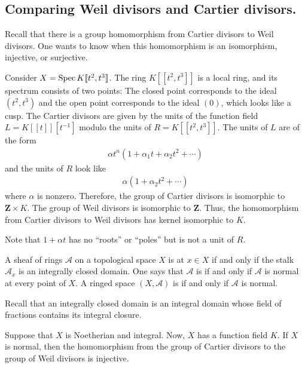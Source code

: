 \documentclass [11 pt, oneside] {article}
\begin{document}
\subsection{Comparing Weil divisors and Cartier divisors.}
Recall that there is a group homomorphism from Cartier divisors to Weil divisors. One wants to know when this homomorphism is an isomorphism, injective, or surjective.

\begin{example}\label{noninjdiv_1}\text{}
Consider $X = \operatorname{Spec} K [\![t^2,t^3]\!]$. The ring $K[\![t^2,t^3]\!]$ is a local ring, and its spectrum consists of two points: The closed point corresponds to the ideal $(t^2,t^3)$ and the open point corresponds to the ideal $(0)$, which looks like a cusp. The Cartier divisors are given by the units of the function field $L= K[\![t]\!][t^{-1}]$ modulo the units of $R = K [\![t^2,t^3]\!]$. The units of $L$ are of the form
\begin{align*}
	\alpha t^n(1+\alpha_1t+\alpha_2t^2+\cdots)
\end{align*}
and the units of $R$ look like 
\begin{align*}
	\alpha(1+\alpha_2t^2 + \cdots)
\end{align*}
where $\alpha$ is nonzero. Therefore, the group of Cartier divisors is isomorphic to $\mathbf{Z}\times K$. The group of Weil divisors is isomorphic to $\mathbf{Z}$. Thus, the homomorphism from Cartier divisors to Weil divisors has kernel isomorphic to $K$. 

Note that $1+\alpha t$ has no ``roots'' or ``poles'' but is not a unit of $R$.
\end{example}

\begin{definition}[EGA I 0 4.1.4]\label{}\text{}
A sheaf of rings $\mathscr{A}$ on a topological space $X$ is  at $x\in X$ if and only if the stalk $\mathscr{A}_x$ is an integrally closed domain. One says that $\mathscr{A}$ is  if and only if $\mathscr{A}$ is normal at every point of $X$. A ringed space $(X,\mathscr{A})$ is  if and only if $\mathscr{A}$ is normal.
\end{definition}

Recall that an integrally closed domain is an integral domain whose field of fractions contains its integral closure. 

Suppose that $X$ is Noetherian and integral. Now, $X$ has a function field $K$. If $X$ is normal, then the homomorphism from the group of Cartier divisors to the group of Weil divisors is injective. 
\end{document}
